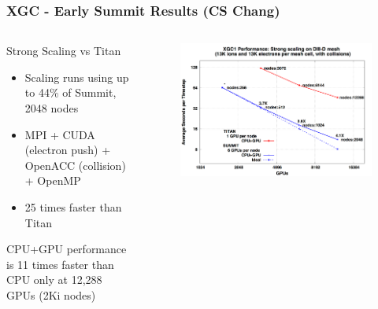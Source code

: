 \documentclass[aspectratio=169]{beamer}
\begin{document}
\begin{frame}
  \frametitle{XGC - Early Summit Results (CS Chang)}
  \begin{columns}
    \begin{column}{0.3\textwidth}
      Strong Scaling vs Titan
      \begin{itemize}
        \item Scaling runs using up to 44\% of Summit, 2048 nodes
        \item MPI + CUDA (electron push) + OpenACC (collision) + OpenMP
        \item 25 times faster than Titan %
      \end{itemize}
      CPU+GPU performance is 11 times faster than CPU only at 12,288 GPUs (2Ki
      nodes)
    \end{column}
    \begin{column}{0.65\textwidth}
      \begin{figure}
        \centering
        \includegraphics[width=\textwidth]{figures/xgcStrongScaling.png}
      \end{figure}
    \end{column}
  \end{columns}
\end{frame}
\end{document}
